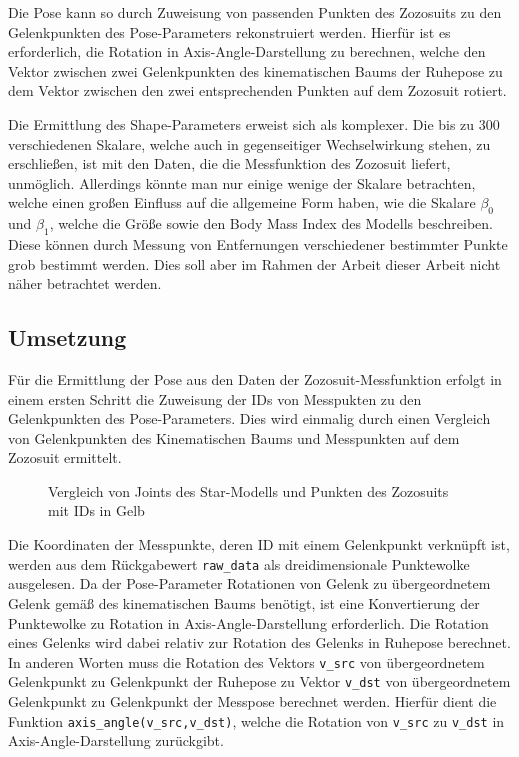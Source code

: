 Die Pose kann so durch Zuweisung von passenden Punkten des Zozosuits zu den Gelenkpunkten des
Pose-Parameters rekonstruiert werden. Hierfür ist es erforderlich, die Rotation in
Axis-Angle-Darstellung zu berechnen, welche den Vektor zwischen zwei Gelenkpunkten des kinematischen Baums der Ruhepose zu dem 
Vektor zwischen den zwei entsprechenden Punkten auf dem Zozosuit rotiert.

Die Ermittlung des Shape-Parameters erweist sich als komplexer. Die bis zu 300 verschiedenen Skalare, welche auch in
gegenseitiger Wechselwirkung stehen, zu erschließen, ist mit den Daten, die die Messfunktion des Zozosuit liefert,
unmöglich. Allerdings könnte man nur einige wenige der Skalare betrachten, welche einen großen Einfluss auf die
allgemeine Form haben, wie die Skalare $\beta _0$ und $\beta _1$, welche die Größe sowie den Body Mass Index des Modells beschreiben. Diese können 
durch Messung von Entfernungen verschiedener bestimmter Punkte grob bestimmt werden. Dies soll aber im Rahmen
der Arbeit dieser Arbeit nicht näher betrachtet werden.

\subsection{Umsetzung}
Für die Ermittlung der Pose aus den Daten der Zozosuit-Messfunktion erfolgt in 
einem ersten Schritt die Zuweisung der IDs von Messpukten zu den Gelenkpunkten des Pose-Parameters.
 Dies wird einmalig durch einen Vergleich von Gelenkpunkten des Kinematischen Baums und 
Messpunkten auf dem Zozosuit ermittelt.

\begin{figure}[H]
  \centering 
   \qquad 
  \caption{Vergleich von Joints des Star-Modells und Punkten des Zozosuits mit IDs in Gelb} 
  \label{fig:pointpos}
\end{figure}

Die Koordinaten der Messpunkte, deren ID mit einem Gelenkpunkt verknüpft ist, werden aus dem Rückgabewert
\texttt{raw\_data} als dreidimensionale Punktewolke ausgelesen. Da der Pose-Parameter Rotationen von Gelenk zu 
übergeordnetem Gelenk gemäß des kinematischen Baums benötigt, ist eine Konvertierung der Punktewolke zu Rotation in 
Axis-Angle-Darstellung erforderlich. Die Rotation eines Gelenks wird dabei relativ zur Rotation des Gelenks in Ruhepose berechnet.
In anderen Worten muss die Rotation des Vektors \texttt{v\_src} von übergeordnetem Gelenkpunkt zu Gelenkpunkt
der Ruhepose zu Vektor \texttt{v\_dst} von übergeordnetem Gelenkpunkt zu Gelenkpunkt der Messpose berechnet werden. Hierfür dient die
Funktion \texttt{axis\_angle(v\_src,v\_dst)}, welche die Rotation von \texttt{v\_src} zu \texttt{v\_dst} in Axis-Angle-Darstellung zurückgibt.

